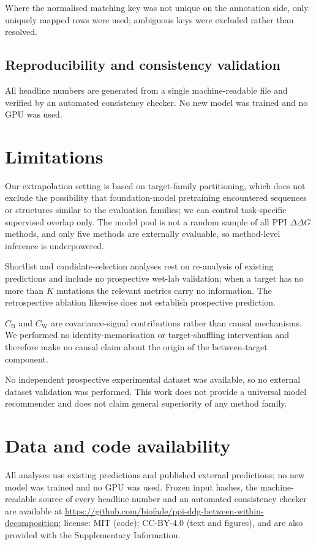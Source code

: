 \documentclass[11pt,a4paper]{article}
\begin{document}
Where the normalised matching key was not unique on the annotation side, only uniquely
mapped rows were used; ambiguous keys were excluded rather than resolved.

\subsection*{Reproducibility and consistency validation}
All headline numbers are generated from a single machine-readable file and verified by an
automated consistency checker. No new model was trained and no GPU was used.

\section{Limitations}
Our extrapolation setting is based on target-family partitioning, which does not exclude
the possibility that foundation-model pretraining encountered sequences or structures
similar to the evaluation families; we can control task-specific supervised overlap only.
The model pool is not a random sample of all PPI $\Delta\Delta G$ methods, and only five
methods are externally evaluable, so method-level inference is underpowered.

Shortlist and candidate-selection analyses rest on re-analysis of existing predictions and
include no prospective wet-lab validation; when a target has no more than $K$ mutations the
relevant metrics carry no information. The retrospective ablation likewise does not
establish prospective prediction.

$C_{\mathrm{B}}$ and $C_{\mathrm{W}}$ are covariance-signal contributions rather than
causal mechanisms. We performed no identity-memorisation or target-shuffling intervention
and therefore make no causal claim about the origin of the between-target component.

No independent prospective experimental dataset was available, so no external dataset
validation was performed. This work does not provide a universal model recommender and does
not claim general superiority of any method family.

\section*{Data and code availability}
All analyses use existing predictions and published external predictions; no new model was trained and no GPU was used. Frozen input hashes, the machine-readable source of every headline number and an automated consistency checker are available at \url{https://github.com/biofade/ppi-ddg-between-within-decomposition}; license: MIT (code); CC-BY-4.0 (text and figures), and are also provided with the Supplementary Information.
\end{document}
